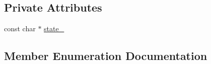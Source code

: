 \subsection*{Private Attributes}
\begin{DoxyCompactItemize}
\item 
const char $\ast$ \hyperlink{classleveldb_1_1_status_a883e92e066654d6e6deaaa31aa0c5e51}{state\+\_\+}
\end{DoxyCompactItemize}


\subsection{Member Enumeration Documentation}
\hypertarget{classleveldb_1_1_status_a86ca3f4adce279a55ac09d2b1595f79e}{}
